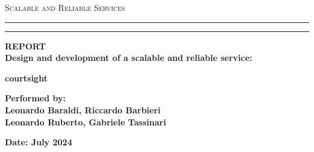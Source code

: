 \documentclass[a4paper]{article}
\numberwithin{equation}{section}
\begin{document}
\begin{titlepage}
\begin{center}
{{\Large{\textsc{Scalable and Reliable Services}}}} \rule[0.1cm]{15.8cm}{0.1mm}
\rule[0.5cm]{15.8cm}{0.6mm}
{\small{\bf REPORT\\
Design and development of a scalable and reliable service:}}
\end{center}
\vspace{15mm}
\begin{center}
{\LARGE{\bf courtsight}}\\
\end{center}
\vspace{40mm}
\par
\noindent
\vspace{20mm}
\begin{center}
    {\large{\bf Performed by:\\
    Leonardo Baraldi, Riccardo Barbieri \\
Leonardo Ruberto, Gabriele Tassinari}}
\end{center}
\vspace{30mm}
\begin{center}
{\large{\bf 
Date: July 2024 }}
\end{center}
\end{titlepage}
\newpage
\newpage
\tableofcontents 
\newpage
    
\newpage






%
\end{document}
